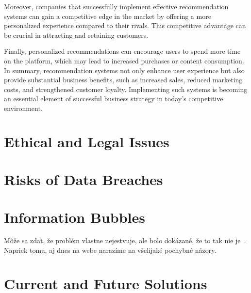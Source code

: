 \documentclass[10pt,twoside,slovak,a4paper]{article}
\begin{document}
Moreover, companies that successfully implement effective recommendation systems can gain a competitive edge in the market by offering a more personalized experience compared to their rivals. This competitive advantage can be crucial in attracting and retaining customers.

Finally, personalized recommendations can encourage users to spend more time on the platform, which may lead to increased purchases or content consumption. In summary, recommendation systems not only enhance user experience but also provide substantial business benefits, such as increased sales, reduced marketing costs, and strengthened customer loyalty. Implementing such systems is becoming an essential element of successful business strategy in today’s competitive environment.

\section{Ethical and Legal Issues} \label{Ethical and Legal Issues}

\section{Risks of Data Breaches} \label{Risks of Data Breaches}

\section{Information Bubbles} \label{Information Bubbles}



Môže sa zdať, že problém vlastne nejestvuje\cite{Coplien:MPD}, ale bolo dokázané, že to tak nie je~\cite{Czarnecki:Staged, Czarnecki:Progress}. Napriek tomu, aj dnes na webe narazíme na všelijaké pochybné názory\cite{PLP-Framework}. 

\section{Current and Future Solutions} \label{Current and Future Solutions}
\end{document}
